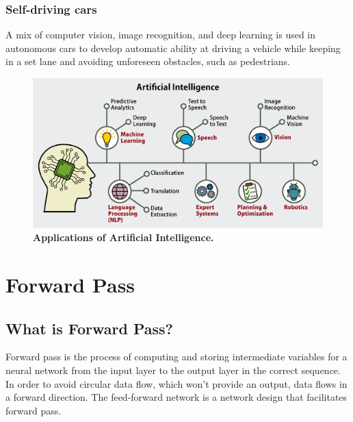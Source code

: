 \documentclass{article}
\begin{document}
\subsubsection{Self-driving cars}
A mix of computer vision, image recognition, and deep learning is used in autonomous cars to develop automatic ability at driving a vehicle while keeping in a set lane and avoiding unforeseen obstacles, such as pedestrians.

\begin{figure}[!htb]
    \centering
    \includegraphics[width=0.6\linewidth]{ai_image.png}
    \caption{\textbf{Applications of Artificial Intelligence.}}
    \label{fig:P1Q3b}
\end{figure}

\pagebreak
\section{Forward Pass}
\subsection{What is Forward Pass?}
Forward pass is the process of computing and storing intermediate variables for a neural network from the input layer to the output layer in the correct sequence. In order to avoid circular data flow, which won't provide an output, data flows in a forward direction. The feed-forward network is a network design that facilitates forward pass.
\end{document}
